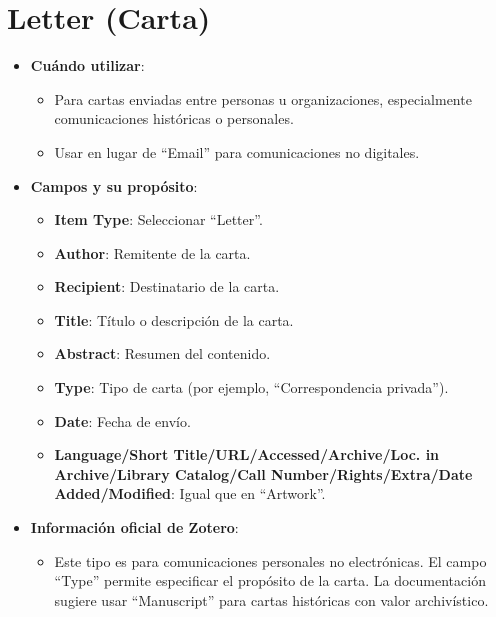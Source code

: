 \documentclass[
  jou,
  floatsintext,
  longtable,
  a4paper,
  nolmodern,
  notxfonts,
  notimes,
  12pt,
  colorlinks=true,linkcolor=blue,citecolor=blue,urlcolor=blue]{apa7}
\providecommand{\tightlist}{%
  \setlength{\itemsep}{0pt}\setlength{\parskip}{0pt}}
\begin{document}
\section{Letter (Carta)}\label{letter-carta}

\begin{itemize}
\tightlist
\item
  \textbf{Cuándo utilizar}:

  \begin{itemize}
  \tightlist
  \item
    Para cartas enviadas entre personas u organizaciones, especialmente
    comunicaciones históricas o personales.
  \item
    Usar en lugar de ``Email'' para comunicaciones no digitales.
  \end{itemize}
\item
  \textbf{Campos y su propósito}:

  \begin{itemize}
  \tightlist
  \item
    \textbf{Item Type}: Seleccionar ``Letter''.
  \item
    \textbf{Author}: Remitente de la carta.
  \item
    \textbf{Recipient}: Destinatario de la carta.
  \item
    \textbf{Title}: Título o descripción de la carta.
  \item
    \textbf{Abstract}: Resumen del contenido.
  \item
    \textbf{Type}: Tipo de carta (por ejemplo, ``Correspondencia
    privada'').
  \item
    \textbf{Date}: Fecha de envío.
  \item
    \textbf{Language/Short Title/URL/Accessed/Archive/Loc. in
    Archive/Library Catalog/Call Number/Rights/Extra/Date
    Added/Modified}: Igual que en ``Artwork''.
  \end{itemize}
\item
  \textbf{Información oficial de Zotero}:

  \begin{itemize}
  \tightlist
  \item
    Este tipo es para comunicaciones personales no electrónicas. El
    campo ``Type'' permite especificar el propósito de la carta. La
    documentación sugiere usar ``Manuscript'' para cartas históricas con
    valor archivístico.
  \end{itemize}
\end{itemize}
\end{document}
